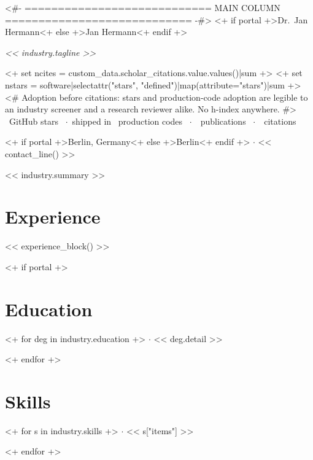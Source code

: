 \documentclass[10pt]{article}
\makeatletter
\DeclareRobustCommand{\sbseries}{\fontseries{sb}\selectfont}
\def\SmallDotuline#1{\bgroup%
  \UL@setULdepth%
  \markoverwith{\begingroup
     \advance\ULdepth0.08ex
     \lower\ULdepth\hbox{\scalebox{0.4}{.}\kern#1}%
     \endgroup}%
  \ULon}
\newcommand{\udot}[1]{\SmallDotuline{0pt}{#1}}
\makeatother
\begin{document}
<#- ============================ MAIN COLUMN ============================ -#>
{\sbseries\largefont\fontsize{26pt}{28pt}\selectfont
 <+ if portal +>\textcolor{black!65}{Dr.\ Jan Hermann}<+ else +>\textcolor{black!40}{Jan} \textcolor{black!65}{Hermann}<+ endif +>}\par
\vspace{0.4em}
{\itshape\color{black!60}<< industry.tagline >>}\par
\vspace{0.5em}
<+ set ncites = custom_data.scholar_citations.value.values()|sum +>
<+ set nstars = software|selectattr("stars", "defined")|map(attribute="stars")|sum +>
<# Adoption before citations: stars and production-code adoption are legible to
   an industry screener and a research reviewer alike. No h-index anywhere. #>
{\small\color{black!60}~GitHub stars
 ~$\cdot$~shipped in ~production codes
 ~$\cdot$~~publications
 ~$\cdot$~~citations}\par
\vspace{0.35em}
{\footnotesize\renewcommand{\udot}[1]{\textcolor{accent}{#1}}%
 <+ if portal +>Berlin, Germany<+ else +>Berlin<+ endif +> $\cdot$ << contact_line() >>}\par
\vspace{0.7em}
{\small << industry.summary >>}\par

\section{Experience}
<< experience_block() >>

<+ if portal +>
\section{Education}
<+ for deg in industry.education +>
{\small{} $\cdot$ << deg.detail >>}\par\vspace{1pt}
<+ endfor +>

\section{Skills}
<+ for s in industry.skills +>
{\small{} $\cdot$ << s["items"] >>}\par\vspace{1pt}
<+ endfor +>
\end{document}
